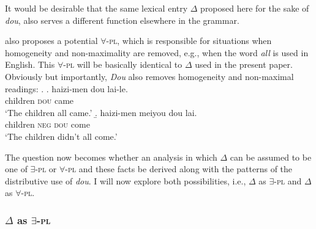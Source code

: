 \documentclass[12pt]{article}
\begin{document}
It would be desirable that the same lexical entry \(\Delta\) proposed here for the sake of \emph{dou}, also serves a different function elsewhere in the grammar.

\citet{bar-levImplicatureAccountHomogeneity2021} also proposes a potential \(\forall\)-\textsc{pl}, which is responsible for situations when homogeneity and non-maximality are removed, e.g., when the word \emph{all} is used in English.
This \(\forall\)-\textsc{pl} will be basically identical to \(\Delta\) used in the present paper.
Obviously but importantly, \emph{Dou} also removes homogeneity and non-maximal readings:
\ex. 
\a. \gll 
haizi-men dou lai-le. \\
children \textsc{dou} came \\
\glt `The children all came.'
\b. \gll 
haizi-men meiyou dou lai. \\
children \textsc{neg} \textsc{dou} come \\
\glt `The children didn't all come.'

The question now becomes whether an analysis in which \(\Delta\) can be assumed to be one of \(\exists\)-\textsc{pl} or \(\forall\)-\textsc{pl} and these facts be derived along with the patterns of the distributive use of \emph{dou}.
I will now explore both possibilities, i.e., \(\Delta\) as \(\exists\)-\textsc{pl} and \(\Delta\) as \(\forall\)-\textsc{pl}.

\subsubsection[Delta as existential pluralizer]{\(\Delta\) as \(\exists\)-\textsc{pl}}
\label{ssub:delta_as_exists_pl}
\end{document}
